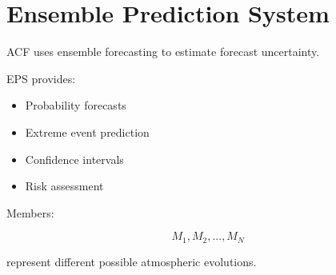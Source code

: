 \section{Ensemble Prediction System}


ACF uses ensemble forecasting to estimate forecast uncertainty.



EPS provides:


\begin{itemize}

\item Probability forecasts

\item Extreme event prediction

\item Confidence intervals

\item Risk assessment

\end{itemize}



Members:


\[
M_1,M_2,...,M_N
\]


represent different possible atmospheric evolutions.
